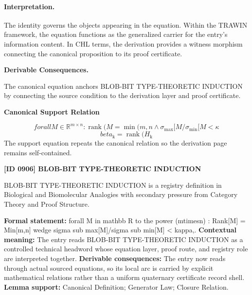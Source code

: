 \paragraph{Interpretation.}
The identity governs the objects appearing in the equation. Within the TRAWIN framework, the equation functions as the generalized carrier for the entry’s information content. In CHL terms, the derivation provides a witness morphism connecting the canonical proposition to its proof certificate.

\par\vspace{0.35em}
\noindent\textbf{Derivable Consequences.}\quad
\begingroup
\footnotesize
\raggedright
The canonical equation anchors BLOB-BIT TYPE-THEORETIC INDUCTION by connecting the source condition to the derivation layer and proof certificate.
\par\endgroup

\noindent\textbf{Canonical Support Relation}\par
\[
forall M \in \mathbb{R}^{m\times n} : \operatorname{rank}(M = \min(m,n \wedge \sigma_{\mathrm{max}}[M/\sigma_{\min}[M < \kappa
\]
\[
beta_{\mathrm{k}} = \operatorname{rank}(H_{\mathrm{k}}
\]
\noindent The support equation repeats the canonical relation so the derivation page remains self-contained.\par

\clearpage
\noindent\textbf{[ID 0906] BLOB-BIT TYPE-THEORETIC INDUCTION}\par
\vspace{0.35em}
\begingroup\small
{}
BLOB-BIT TYPE-THEORETIC INDUCTION is a registry definition in Biological and Biomolecular Analogies with secondary pressure from Category Theory and Proof Structure.

\begingroup\footnotesize\setlength{\emergencystretch}{3em}\sloppy
\textbf{Formal statement:} forall M in mathbb R to the power (mtimesn) : Rank[M] = Min[m,n] wedge sigma sub max[M]/sigma sub min[M] < kappa,. \textbf{Contextual meaning:} The entry reads BLOB-BIT TYPE-THEORETIC INDUCTION as a controlled technical headword whose equation layer, proof route, and registry role are interpreted together. \textbf{Derivable consequences:} The entry now reads through actual sourced equations, so its local arc is carried by explicit mathematical relations rather than a uniform quaternary certificate record shell. \textbf{Lemma support:} Canonical Definition; Generator Law; Closure Relation.\par
\endgroup

